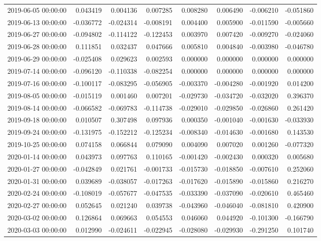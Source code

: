 \begin{tabular}{lrrrrrrr}
2019-06-05 00:00:00 & 0.043419 & 0.004136 & 0.007285 & 0.008280 & 0.006490 & -0.006210 & -0.051860 \\
2019-06-13 00:00:00 & -0.036772 & -0.024314 & -0.008191 & 0.004400 & 0.005900 & -0.011590 & -0.005660 \\
2019-06-27 00:00:00 & -0.094802 & -0.114122 & -0.122453 & 0.003970 & 0.007420 & -0.009270 & -0.024060 \\
2019-06-28 00:00:00 & 0.111851 & 0.032437 & 0.047666 & 0.005810 & 0.004840 & -0.003980 & -0.046780 \\
2019-06-29 00:00:00 & -0.025408 & 0.029623 & 0.002593 & 0.000000 & 0.000000 & 0.000000 & 0.000000 \\
2019-07-14 00:00:00 & -0.096120 & -0.110338 & -0.082254 & 0.000000 & 0.000000 & 0.000000 & 0.000000 \\
2019-07-16 00:00:00 & -0.100117 & -0.083295 & -0.056905 & -0.003370 & -0.004280 & -0.001920 & 0.014200 \\
2019-08-05 00:00:00 & -0.015119 & 0.001460 & 0.007201 & -0.029730 & -0.034720 & -0.032020 & 0.396370 \\
2019-08-14 00:00:00 & -0.066582 & -0.069783 & -0.114738 & -0.029010 & -0.029850 & -0.026860 & 0.261420 \\
2019-09-18 00:00:00 & 0.010507 & 0.307498 & 0.097936 & 0.000350 & -0.001040 & -0.001630 & -0.033930 \\
2019-09-24 00:00:00 & -0.131975 & -0.152212 & -0.125234 & -0.008340 & -0.014630 & -0.001680 & 0.143530 \\
2019-10-25 00:00:00 & 0.074158 & 0.066844 & 0.079090 & 0.004090 & 0.007020 & 0.001260 & -0.077320 \\
2020-01-14 00:00:00 & 0.043973 & 0.097763 & 0.110165 & -0.001420 & -0.002430 & 0.000320 & 0.005680 \\
2020-01-27 00:00:00 & -0.042849 & 0.021761 & -0.001733 & -0.015730 & -0.018850 & -0.007610 & 0.252060 \\
2020-01-31 00:00:00 & 0.039689 & -0.038057 & -0.017263 & -0.017620 & -0.015890 & -0.015860 & 0.216270 \\
2020-02-24 00:00:00 & -0.108019 & -0.057677 & -0.047535 & -0.033390 & -0.037090 & -0.020610 & 0.465460 \\
2020-02-27 00:00:00 & 0.052645 & 0.021240 & 0.039738 & -0.043960 & -0.046040 & -0.081810 & 0.420900 \\
2020-03-02 00:00:00 & 0.126864 & 0.069663 & 0.054553 & 0.046060 & 0.044920 & -0.101300 & -0.166790 \\
2020-03-03 00:00:00 & 0.012990 & -0.024611 & -0.022945 & -0.028080 & -0.029930 & -0.291250 & 0.101740 \\

\end{tabular}
